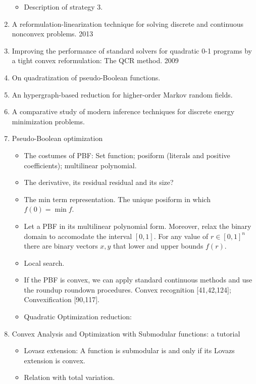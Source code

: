 \begin{enumerate}
\begin{itemize}
		\item{Description of strategy 3.}
	\end{itemize}
	\item{A reformulation-linearization technique for solving discrete and continuous nonconvex problems. 2013}
	\item{Improving the performance of standard solvers for quadratic 0-1 programs by a tight convex reformulation: The QCR method. 2009}
	\item{On quadratization of pseudo-Boolean functions.}
	\item{An hypergraph-based reduction for higher-order Markov
random fields.}
	\item{A comparative study of modern inference techniques for discrete energy minimization problems.}
	\item{Pseudo-Boolean optimization}
	\begin{itemize}
		\item{The costumes of PBF: Set function; posiform (literals and positive coefficients); multilinear polynomial.}
		\item{The derivative, its residual residual and its size?}
		\item{The min term representation. The unique posiform in which $f(0) = \min f$.}
		\item{Let a PBF in its multilinear polynomial form. Moreover, relax the binary domain to accomodate the interval $[0,1]$. For any value of $r \in [0,1]^n$ there are binary vectors $x,y$ that lower and upper bounds $f(r)$. }
		\item{Local search.}
		\item{If the PBF is convex, we can apply standard continuous methods and use the roundup roundown procedures. Convex recognition [41,42,124]; Convexification [90,117].}
		\item{Quadratic Optimization reduction: }
	\end{itemize}
	\item{Convex Analysis and Optimization with Submodular functions: a tutorial}
	\begin{itemize}
	\item{Lovasz extension: A function is submodular is and only if its Lovazs extension is convex.}
	\item{Relation with total variation.}
	\end{itemize}
\end{enumerate}